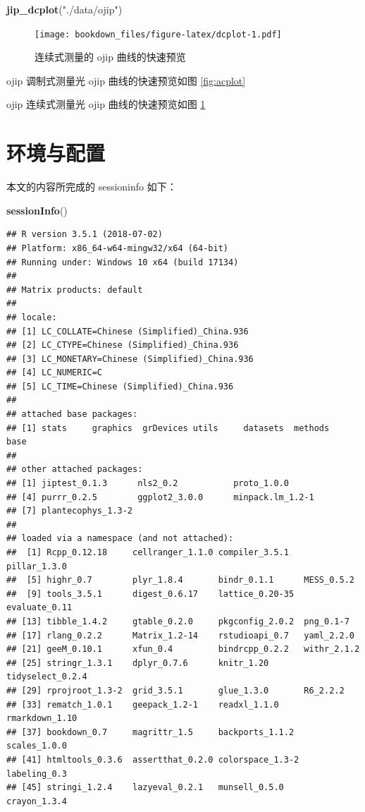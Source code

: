 \documentclass[]{krantz}
\makeatletter
\newenvironment{Shaded}{\begin{snugshade}}{\end{snugshade}}
\newcommand{\KeywordTok}[1]{\textcolor[rgb]{0.13,0.29,0.53}{\textbf{#1}}}
\newcommand{\StringTok}[1]{\textcolor[rgb]{0.31,0.60,0.02}{#1}}
\newcommand{\NormalTok}[1]{#1}
\newenvironment{kframe}{%
\medskip{}
\setlength{\fboxsep}{.8em}
 \def\at@end@of@kframe{}%
 \ifinner\ifhmode%
  \def\at@end@of@kframe{\end{minipage}}%
  \begin{minipage}{\columnwidth}%
 \fi\fi%
 \def\FrameCommand##1{\hskip\@totalleftmargin \hskip-\fboxsep
 \colorbox{shadecolor}{##1}\hskip-\fboxsep
     \hskip-\linewidth \hskip-\@totalleftmargin \hskip\columnwidth}%
 \MakeFramed {\advance\hsize-\width
   \@totalleftmargin\z@ \linewidth\hsize
   \@setminipage}}%
 {\par\unskip\endMakeFramed%
 \at@end@of@kframe}
\renewenvironment{Shaded}{\begin{kframe}}{\end{kframe}}
\theoremstyle{definition}
\theoremstyle{definition}
\theoremstyle{definition}
\theoremstyle{remark}
\makeatother
\begin{document}
\begin{Shaded}
\begin{Highlighting}[]
\KeywordTok{jip_dcplot}\NormalTok{(}\StringTok{"./data/ojip"}\NormalTok{)}
\end{Highlighting}
\end{Shaded}

\begin{figure}
\centering
\texttt{[image: bookdown\_files/figure-latex/dcplot-1.pdf]}
\caption{\label{fig:dcplot}连续式测量的 ojip 曲线的快速预览}
\end{figure}

ojip 调制式测量光 ojip 曲线的快速预览如图 \ref{fig:acplot}

ojip 连续式测量光 ojip 曲线的快速预览如图 \ref{fig:dcplot}

\chapter{环境与配置}

本文的内容所完成的 sessioninfo 如下：

\begin{Shaded}
\begin{Highlighting}[]
\KeywordTok{sessionInfo}\NormalTok{()}
\end{Highlighting}
\end{Shaded}

\begin{verbatim}
## R version 3.5.1 (2018-07-02)
## Platform: x86_64-w64-mingw32/x64 (64-bit)
## Running under: Windows 10 x64 (build 17134)
## 
## Matrix products: default
## 
## locale:
## [1] LC_COLLATE=Chinese (Simplified)_China.936 
## [2] LC_CTYPE=Chinese (Simplified)_China.936   
## [3] LC_MONETARY=Chinese (Simplified)_China.936
## [4] LC_NUMERIC=C                              
## [5] LC_TIME=Chinese (Simplified)_China.936    
## 
## attached base packages:
## [1] stats     graphics  grDevices utils     datasets  methods   base     
## 
## other attached packages:
## [1] jiptest_0.1.3      nls2_0.2           proto_1.0.0       
## [4] purrr_0.2.5        ggplot2_3.0.0      minpack.lm_1.2-1  
## [7] plantecophys_1.3-2
## 
## loaded via a namespace (and not attached):
##  [1] Rcpp_0.12.18     cellranger_1.1.0 compiler_3.5.1   pillar_1.3.0    
##  [5] highr_0.7        plyr_1.8.4       bindr_0.1.1      MESS_0.5.2      
##  [9] tools_3.5.1      digest_0.6.17    lattice_0.20-35  evaluate_0.11   
## [13] tibble_1.4.2     gtable_0.2.0     pkgconfig_2.0.2  png_0.1-7       
## [17] rlang_0.2.2      Matrix_1.2-14    rstudioapi_0.7   yaml_2.2.0      
## [21] geeM_0.10.1      xfun_0.4         bindrcpp_0.2.2   withr_2.1.2     
## [25] stringr_1.3.1    dplyr_0.7.6      knitr_1.20       tidyselect_0.2.4
## [29] rprojroot_1.3-2  grid_3.5.1       glue_1.3.0       R6_2.2.2        
## [33] rematch_1.0.1    geepack_1.2-1    readxl_1.1.0     rmarkdown_1.10  
## [37] bookdown_0.7     magrittr_1.5     backports_1.1.2  scales_1.0.0    
## [41] htmltools_0.3.6  assertthat_0.2.0 colorspace_1.3-2 labeling_0.3    
## [45] stringi_1.2.4    lazyeval_0.2.1   munsell_0.5.0    crayon_1.3.4
\end{verbatim}

\cleardoublepage



\backmatter
\printindex
\end{document}
